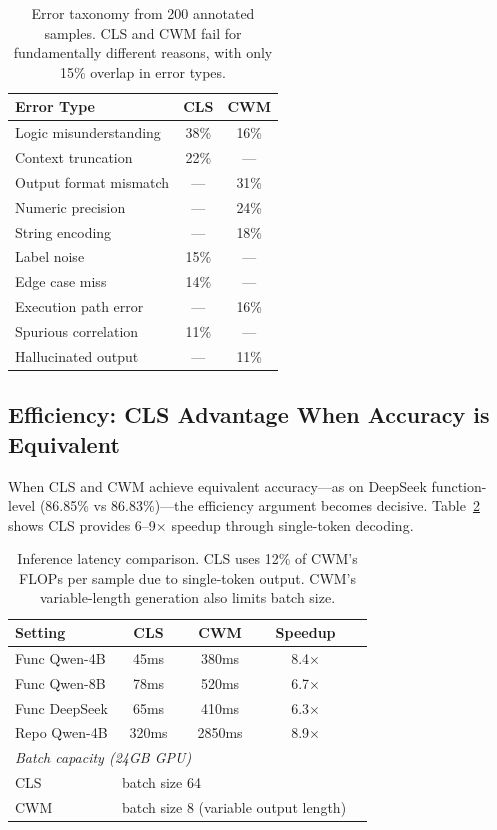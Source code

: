 \documentclass[11pt,a4paper]{article}
\begin{document}
\begin{table}[t]
\centering
\small
\begin{tabular}{lcc}
\toprule
\textbf{Error Type} & \textbf{CLS} & \textbf{CWM} \\
\midrule
Logic misunderstanding & 38\% & 16\% \\
Context truncation & 22\% & --- \\
Output format mismatch & --- & 31\% \\
Numeric precision & --- & 24\% \\
String encoding & --- & 18\% \\
Label noise & 15\% & --- \\
Edge case miss & 14\% & --- \\
Execution path error & --- & 16\% \\
Spurious correlation & 11\% & --- \\
Hallucinated output & --- & 11\% \\
\bottomrule
\end{tabular}
\caption{Error taxonomy from 200 annotated samples. CLS and CWM fail for fundamentally different reasons, with only 15\% overlap in error types.}
\label{tab:taxonomy}
\end{table}

\subsection{Efficiency: CLS Advantage When Accuracy is Equivalent}
\label{sec:efficiency}

When CLS and CWM achieve equivalent accuracy---as on DeepSeek function-level (86.85\% vs 86.83\%)---the efficiency argument becomes decisive. Table~\ref{tab:efficiency} shows CLS provides 6--9$\times$ speedup through single-token decoding.

\begin{table}[t]
\centering
\small
\begin{tabular}{lcccr}
\toprule
\textbf{Setting} & \textbf{CLS} & \textbf{CWM} & \textbf{Speedup} \\
\midrule
Func Qwen-4B & 45ms & 380ms & 8.4$\times$ \\
Func Qwen-8B & 78ms & 520ms & 6.7$\times$ \\
Func DeepSeek & 65ms & 410ms & 6.3$\times$ \\
Repo Qwen-4B & 320ms & 2850ms & 8.9$\times$ \\
\midrule
\multicolumn{4}{l}{\textit{Batch capacity (24GB GPU)}} \\
CLS & \multicolumn{3}{l}{batch size 64} \\
CWM & \multicolumn{3}{l}{batch size 8 (variable output length)} \\
\bottomrule
\end{tabular}
\caption{Inference latency comparison. CLS uses 12\% of CWM's FLOPs per sample due to single-token output. CWM's variable-length generation also limits batch size.}
\label{tab:efficiency}
\end{table}
\end{document}
